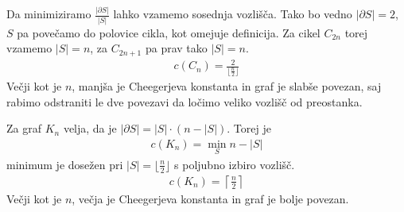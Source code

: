 \begin{primer}[Cikli]
    \hspace{0em}
    \begin{center}
    \end{center}

    Da minimiziramo \(\frac{\lvert \partial S\rvert}{\lvert S\rvert}\) lahko vzamemo sosednja vozlišča. Tako bo vedno \(\lvert \partial S\rvert = 2\), \(S\) pa povečamo do polovice cikla, kot omejuje definicija. Za cikel \(C_{2n}\) torej vzamemo \(\lvert S\rvert = n\), za \(C_{2n+1}\) pa prav tako \(\lvert S\rvert = n\).
    \begin{align*}
        c(C_n) = \frac{2}{\lfloor \frac n2\rfloor}
    \end{align*}
    Večji kot je \(n\), manjša je Cheegerjeva konstanta in graf je slabše povezan, saj rabimo odstraniti le dve povezavi da ločimo veliko vozlišč od preostanka.
\end{primer}
\begin{primer}
    \hspace{0em}
    \begin{center}
    \end{center}
    Za graf \(K_n\) velja, da je \(\lvert \partial S\rvert = \lvert S\rvert \cdot (n - \lvert S\rvert)\). Torej je
    \begin{align*}
        c(K_n) = \min_{S} n-\lvert S\rvert
    \end{align*}
    minimum je dosežen pri \(\lvert S\rvert = \lfloor\frac n2\rfloor\) s poljubno izbiro vozlišč.
    \begin{align*}
        c(K_n) = \left\lceil \frac n2 \right\rceil
    \end{align*}
    Večji kot je \(n\), večja je Cheegerjeva konstanta in graf je bolje povezan.
\end{primer}
